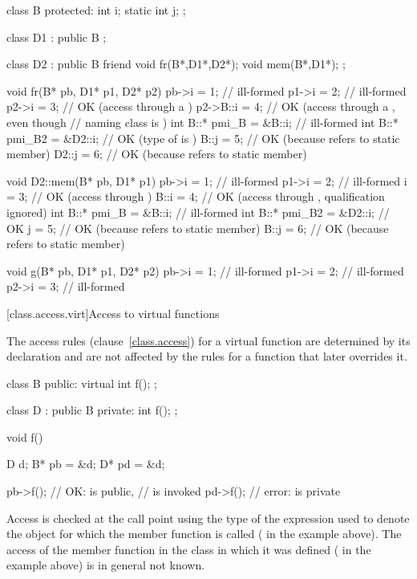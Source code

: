 \begin{codeblock}
class B {
protected:
    int i;
    static int j;
};

class D1 : public B {
};

class D2 : public B {
    friend void fr(B*,D1*,D2*);
    void mem(B*,D1*);
};

void fr(B* pb, D1* p1, D2* p2)
{
    pb->i = 1;                  // ill-formed
    p1->i = 2;                  // ill-formed
    p2->i = 3;                  // OK (access through a )
    p2->B::i = 4;               // OK (access through a , even though
                                // naming class is )
    int B::* pmi_B = &B::i;     // ill-formed
    int B::* pmi_B2 = &D2::i;   // OK (type of  is )
    B::j = 5;                   // OK (because refers to static member)
    D2::j = 6;                  // OK (because refers to static member)
}

void D2::mem(B* pb, D1* p1)
{
    pb->i = 1;                  // ill-formed
    p1->i = 2;                  // ill-formed
    i = 3;                      // OK (access through )
    B::i = 4;                   // OK (access through , qualification ignored)
    int B::* pmi_B = &B::i;     // ill-formed
    int B::* pmi_B2 = &D2::i;   // OK
    j = 5;                      // OK (because  refers to static member)
    B::j = 6;                   // OK (because  refers to static member)
}

void g(B* pb, D1* p1, D2* p2)
{
    pb->i = 1;                  // ill-formed
    p1->i = 2;                  // ill-formed
    p2->i = 3;                  // ill-formed
}
\end{codeblock}
\exitexampleb

[class.access.virt]{Access to virtual functions}%

\pnum
The access rules (clause~\ref{class.access}) for a virtual function are determined by its declaration
and are not affected by the rules for a function that later overrides it.
\enterexample

\begin{codeblock}
class B {
public:
    virtual int f();
};

class D : public B {
private:
    int f();
};

void f()
{
    D d;
    B* pb = &d;
    D* pd = &d;

    pb->f();                    // OK:  is public,
                                //  is invoked
    pd->f();                    // error:  is private
}
\end{codeblock}
\exitexampleb
Access is checked at the call point using the type of the expression used
to denote the object for which the member function is called
(
in the example above).
The access of the member function in the class in which it was defined
(
in the example above) is in general not known.


